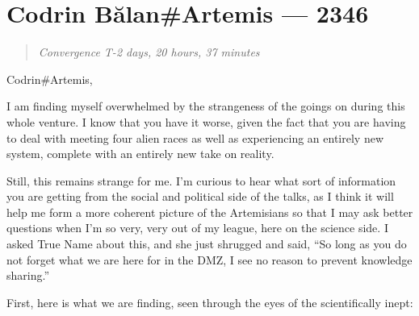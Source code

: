 \hypertarget{codrin-bux103lanartemis-2346}{%
\chapter{Codrin Bălan\#Artemis — 2346}}

\begin{quote}
\emph{Convergence T-2 days, 20 hours, 37 minutes}
\end{quote}

\noindent Codrin\#Artemis,

I am finding myself overwhelmed by the strangeness of the goings on during this whole venture. I know that you have it worse, given the fact that you are having to deal with meeting four alien races as well as experiencing an entirely new system, complete with an entirely new take on reality.

Still, this remains strange for me. I'm curious to hear what sort of information you are getting from the social and political side of the talks, as I think it will help me form a more coherent picture of the Artemisians so that I may ask better questions when I'm so very, very out of my league, here on the science side. I asked True Name about this, and she just shrugged and said, ``So long as you do not forget what we are here for in the DMZ, I see no reason to prevent knowledge sharing.''

First, here is what we are finding, seen through the eyes of the scientifically inept:

